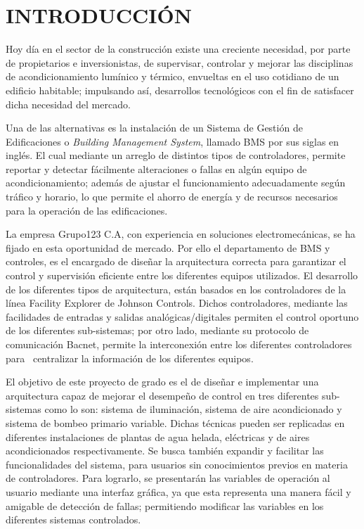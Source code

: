 \chapter*{INTRODUCCIÓN}
\thispagestyle{empty}
Hoy día en el sector de la construcción existe una creciente necesidad, por parte de propietarios e inversionistas, de supervisar, controlar y mejorar las disciplinas de acondicionamiento lumínico y térmico, envueltas en el uso cotidiano de un edificio habitable; impulsando así, desarrollos tecnológicos con el fin de satisfacer dicha necesidad del mercado. 

Una de las alternativas es la instalación de un Sistema de Gestión de Edificaciones o \textit{Building Management System}, llamado BMS por sus siglas en inglés. El cual mediante un arreglo de distintos tipos de controladores, permite reportar y detectar fácilmente alteraciones o fallas en algún equipo de acondicionamiento; además de ajustar el funcionamiento adecuadamente según tráfico y horario, lo que permite el ahorro de energía y de recursos necesarios para la operación de las edificaciones.

La empresa Grupo123 C.A, con experiencia en soluciones electromecánicas, se ha fijado en esta oportunidad de mercado. Por ello el departamento de BMS y controles, es el encargado de diseñar la arquitectura correcta para garantizar el control y supervisión eficiente entre los diferentes equipos utilizados. El desarrollo de los diferentes tipos de arquitectura, están basados en los controladores de la línea Facility Explorer de Johnson Controls. Dichos controladores, mediante las facilidades de entradas y salidas analógicas/digitales permiten el control oportuno de los diferentes sub-sistemas; por otro lado, mediante su protocolo de comunicación Bacnet, permite la interconexión entre los diferentes controladores para  centralizar la información de los diferentes equipos.

El objetivo de este proyecto de grado es el de diseñar e implementar una arquitectura capaz de mejorar el desempeño de control en tres diferentes sub-sistemas como lo son: sistema de iluminación, sistema de aire acondicionado y sistema de bombeo primario variable. Dichas técnicas pueden ser replicadas en diferentes instalaciones de plantas de agua helada, eléctricas y de aires acondicionados respectivamente. Se busca también expandir y facilitar las funcionalidades del sistema, para usuarios sin conocimientos previos en materia de controladores. Para lograrlo, se presentarán las variables de operación al usuario mediante una interfaz gráfica, ya que esta representa una manera fácil y amigable de detección de fallas; permitiendo modificar las variables en los diferentes sistemas controlados.\newline


